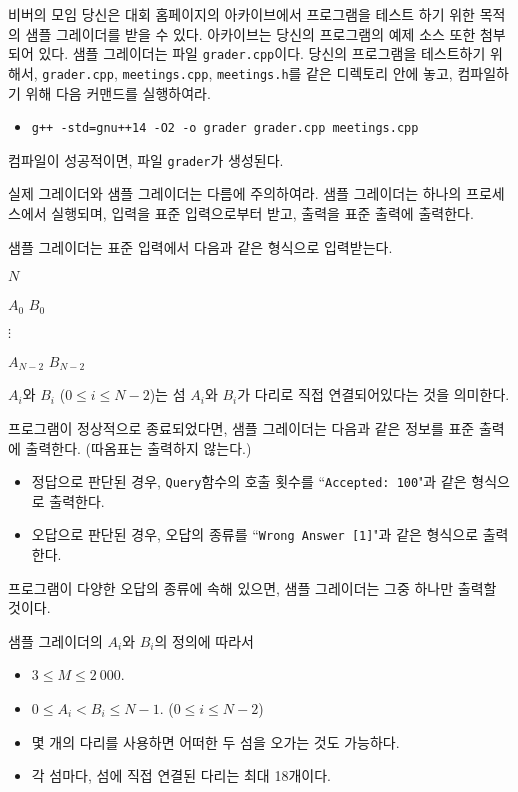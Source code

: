 \begin{problem}{비버의 모임}
	당신은 대회 홈페이지의 아카이브에서 프로그램을 테스트 하기 위한 목적의 샘플 그레이더를 받을 수 있다. 아카이브는 당신의 프로그램의 예제 소스 또한 첨부되어 있다.
	샘플 그레이더는 파일 \texttt{grader.cpp}이다. 당신의 프로그램을 테스트하기 위해서, \texttt{grader.cpp}, \texttt{meetings.cpp}, \texttt{meetings.h}를 같은 디렉토리 안에 놓고, 컴파일하기 위해 다음 커맨드를 실행하여라.
	
	\begin{itemize}
		\item \texttt{g++ -std=gnu++14 -O2 -o grader grader.cpp meetings.cpp}
	\end{itemize}
	
	컴파일이 성공적이면, 파일 \texttt{grader}가 생성된다.
	
	실제 그레이더와 샘플 그레이더는 다름에 주의하여라. 샘플 그레이더는 하나의 프로세스에서 실행되며, 입력을 표준 입력으로부터 받고, 출력을 표준 출력에 출력한다.
	
	\InputFile
	
	샘플 그레이더는 표준 입력에서 다음과 같은 형식으로 입력받는다.
	
	$N$
	
	$A_0$ $B_0$
	
	$\vdots$
	
	$A_{N-2}$ $B_{N-2}$
	
	$A_i$와 $B_i$ ($0 \le i \le N-2$)는 섬 $A_i$와 $B_i$가 다리로 직접 연결되어있다는 것을 의미한다.
	
	\OutputFile
	
	프로그램이 정상적으로 종료되었다면, 샘플 그레이더는 다음과 같은 정보를 표준 출력에 출력한다. (따옴표는 출력하지 않는다.)
	
	\begin{itemize}
		\item 정답으로 판단된 경우, \texttt{Query}함수의 호출 횟수를 ``\texttt{Accepted: 100}"과 같은 형식으로 출력한다.
		\item 오답으로 판단된 경우, 오답의 종류를 ``\texttt{Wrong Answer [1]}"과 같은 형식으로 출력한다.
	\end{itemize}
	
	프로그램이 다양한 오답의 종류에 속해 있으면, 샘플 그레이더는 그중 하나만 출력할 것이다.
	
	\Constraints
	
	샘플 그레이더의 $A_i$와 $B_i$의 정의에 따라서
	
	\begin{itemize}
		\item $3 \le M \le 2\ 000$.
		\item $0 \le A_i < B_i \le N-1$. ($0 \le i \le N-2$)
		\item 몇 개의 다리를 사용하면 어떠한 두 섬을 오가는 것도 가능하다.
		\item 각 섬마다, 섬에 직접 연결된 다리는 최대 18개이다.
	\end{itemize}
	

\end{problem}
